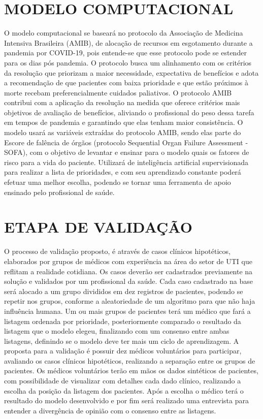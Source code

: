 \documentclass[12pt]{article}
\begin{document}
\section{MODELO COMPUTACIONAL}

O modelo computacional se baseará no protocolo da Associação de Medicina Intensiva Brasileira (AMIB), de alocação de recursos em esgotamento durante a pandemia por COVID-19, pois entende-se que esse protocolo pode se estender para os dias pós pandemia. O protocolo busca um alinhamento com os critérios da resolução que priorizam a maior necessidade, expectativa de benefícios e adota a recomendação de que pacientes com baixa prioridade e que estão próximos à morte recebam preferencialmente cuidados paliativos. O protocolo AMIB contribui com a aplicação da resolução na medida que oferece critérios mais objetivos de avaliação de benefícios, aliviando o profissional do peso dessa tarefa em tempos de pandemia e garantindo que elas tenham maior consistência.
O modelo usará as variáveis extraídas do protocolo AMIB, sendo elas parte do Escore de falência de órgãos (protocolo Sequential Organ Failure Assessment - SOFA), com o objetivo de levantar e ensinar para o modelo quais os fatores de risco para a vida do paciente.
Utilizará de inteligência artificial supervisionada para realizar a lista de prioridades, e com seu aprendizado constante poderá efetuar uma melhor escolha, podendo se tornar uma ferramenta de apoio ensinado pelo profissional de saúde.

\section{ETAPA DE VALIDAÇÃO}
O processo de validação proposto, é através de casos clínicos hipotéticos, elaborados por grupos de médicos com experiência na área do setor de UTI que reflitam a realidade cotidiana. Os casos deverão ser cadastrados previamente na solução e validados por um profissional da saúde. Cada caso cadastrado na base será alocado a um grupo divididos em dez registros de pacientes, podendo se repetir nos grupos, conforme a aleatoriedade de um algoritmo para que não haja influência humana.
Um ou mais grupos de pacientes  terá  um  médico  que  fará  a  listagem  ordenada por prioridade, posteriormente comparado o resultado da listagem que o modelo elegeu, finalizando com um consenso entre ambas listagens, definindo se o modelo deve ter mais um ciclo de aprendizagem.
A proposta para a validação é possuir dez médicos voluntários para participar, avaliando os casos clínicos hipotéticos, realizando a separação entre os grupos de pacientes.
Os médicos voluntários terão em mãos os dados sintéticos de pacientes, com possibilidade de visualizar com detalhes cada dado clínico, realizando a escolha da posição da listagem dos pacientes. Após a escolha o médico terá o resultado do modelo desenvolvido e por fim será realizado uma entrevista para entender a divergência de opinião com o consenso entre as listagens.
\end{document}
